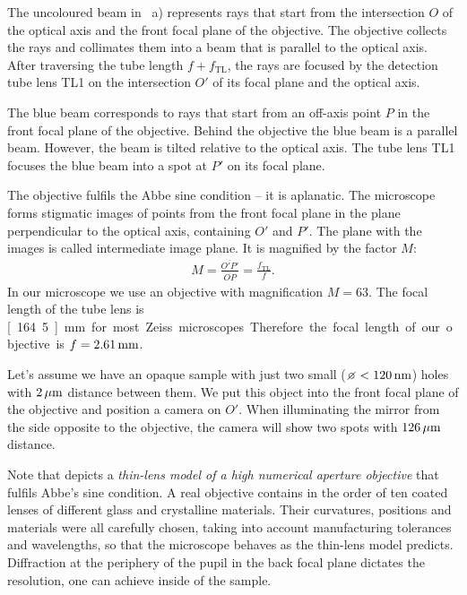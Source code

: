 The uncoloured beam in ~a) represents
rays that start from the intersection $O$ of the optical axis and the
front focal plane of the objective. The objective collects the rays
and collimates them into a beam that is parallel to the optical
axis. After traversing the tube length $f+f_\textrm{TL}$, the rays are
focused by the detection tube lens TL1 on the intersection $O'$ of its
focal plane and the optical axis. 

The blue beam corresponds to rays that start from an off-axis point
$P$ in the front focal plane of the objective. Behind the objective
the blue beam is a parallel beam. However, the beam is tilted relative
to the optical axis. The tube lens TL1 focuses the blue beam into a
spot at $P'$ on its focal plane.

The objective fulfils the Abbe sine condition -- it is aplanatic. The
microscope forms stigmatic images of points from the front focal plane
in the plane perpendicular to the optical axis, containing $O'$ and
$P'$. The plane with the images is called intermediate image plane. It
is magnified by the factor $M$:
\begin{align}
  M=\frac{\overline{O'P'}}{\overline{OP}}=\frac{f_\textrm{TL}}{f}.
\end{align}
In our microscope we use an objective with magnification $M=63$. The
focal length of the tube lens is \unit[164.5]{mm} for most Zeiss
microscopes. Therefore the focal length of our objective is
$f=\unit[2.61]{mm}$.

Let's assume we have an opaque sample with just two small
($\diameter<\unit[120]{nm}$) holes with $\unit[2]{\mu m}$ distance
between them.  We put this object into the front focal plane of the
objective and position a camera on $O'$. When illuminating the mirror
from the side opposite to the objective, the camera will show two
spots with $\unit[126]{\mu m}$ distance.


Note that  depicts a \emph{thin-lens
  model of a high numerical aperture objective} that fulfils Abbe's
sine condition. A real objective contains in the order of ten coated
lenses of different glass and crystalline materials. Their curvatures,
positions and materials were all carefully chosen, taking into account
manufacturing tolerances and wavelengths, so that the microscope
behaves as the thin-lens model predicts. Diffraction at the periphery
of the pupil in the back focal plane dictates the resolution, one can
achieve inside of the sample.

